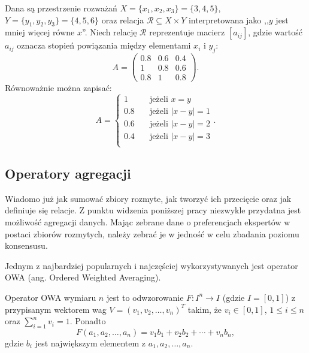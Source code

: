\begin{example}
Dana są przestrzenie rozważań $X=\{ x_1,x_2,x_3 \} = \{3,4,5\}$,
$Y=\{y_1,y_2,y_3\} = \{4,5,6\}$ oraz relacja $\mathcal{R} \subseteq X \times Y$
interpretowana jako ,,$y$ jest mniej więcej równe $x$''. Niech relację
$\mathcal{R}$ reprezentuje macierz $[a_{ij}]$, gdzie wartość $a_{ij}$ oznacza
stopień powiązania między elementami $x_i$ i $y_j$:
$$A = 
\begin{pmatrix}
0.8 & 0.6 & 0.4 \\
  1 & 0.8 & 0.6 \\
0.8 &   1 & 0.8
\end{pmatrix}.
$$
Równoważnie można zapisać:
$$
A = 
\left\{ 
	\begin{array}{cl}
	  1 & \quad \textrm{jeżeli } x = y \\
      0.8 & \quad \textrm{jeżeli } |x - y| = 1 \\
      0.6 & \quad \textrm{jeżeli } |x - y| = 2 \\
      0.4 & \quad \textrm{jeżeli } |x - y| = 3 \\
  	\end{array} 
  \right..
$$
\end{example}

\subsection{Operatory agregacji}
Wiadomo już jak sumować zbiory rozmyte, jak tworzyć ich przecięcie oraz jak
definiuje się relacje. Z punktu widzenia poniższej pracy niezwykle przydatna
jest możliwość agregacji danych. Mając zebrane dane o preferencjach ekspertów w
postaci zbiorów rozmytych, należy zebrać je w jedność w celu zbadania poziomu
konsensusu.

Jednym z najbardziej popularnych i najczęściej wykorzystywanych jest operator
OWA (ang. Ordered Weighted Averaging).

\begin{definition}
Operator OWA wymiaru $n$ jest to odwzorowanie $F : I^n \rightarrow I$ (gdzie
$I=[0,1]$) z przypisanym wektorem wag $V=(v_1,v_2,\dotsc,v_n)^T$ takim, że
$v_i \in [0,1]$, $1 \leq i \leq n$ oraz $\sum_{i=1}^{n} v_i = 1$.
Ponadto
\begin{equation}
F(a_1,a_2,\dotsc,a_n) = v_1b_1 + v_2b_2 + \dotsb + v_nb_n,
\end{equation}
gdzie $b_i$ jest największym elementem z $a_1,a_2,\dotsc, a_n.$
\end{definition}

